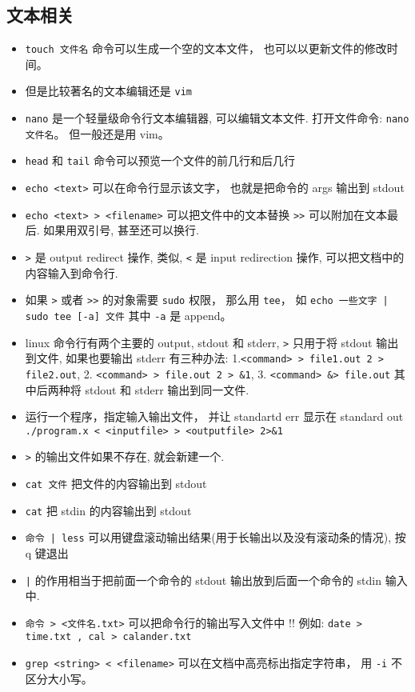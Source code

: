\subsection{文本相关}
\begin{itemize}
\item \verb`touch 文件名` 命令可以生成一个空的文本文件， 也可以以更新文件的修改时间。
\item 但是比较著名的文本编辑还是 \verb|vim|
\item \verb`nano` 是一个轻量级命令行文本编辑器, 可以编辑文本文件. 打开文件命令: \verb`nano 文件名`。 但一般还是用 vim。
\item \verb`head` 和 \verb`tail` 命令可以预览一个文件的前几行和后几行
\item \verb`echo <text>` 可以在命令行显示该文字， 也就是把命令的 args 输出到 stdout
\item \verb`echo <text> > <filename>` 可以把文件中的文本替换 \verb`>>` 可以附加在文本最后. 如果用双引号, 甚至还可以换行.
\item \verb`>` 是 output redirect 操作, 类似, \verb`<` 是 input redirection 操作, 可以把文档中的内容输入到命令行.
\item 如果 \verb|>| 或者 \verb|>>| 的对象需要 \verb|sudo| 权限， 那么用 \verb|tee|， 如 \verb`echo 一些文字 | sudo tee [-a] 文件` 其中 \verb|-a| 是 append。
\item linux 命令行有两个主要的 output, stdout 和 stderr, \verb`>` 只用于将 stdout 输出到文件, 如果也要输出 stderr 有三种办法: 1.\verb`<command> > file1.out 2 > file2.out`, 2. \verb`<command> > file.out 2 > &1`, 3. \verb`<command> &> file.out` 其中后两种将 stdout 和 stderr 输出到同一文件.
\item 运行一个程序，指定输入输出文件， 并让 standartd err 显示在 standard out \verb`./program.x < <inputfile> > <outputfile> 2>&1` 
\item \verb`>` 的输出文件如果不存在, 就会新建一个.
\item  \verb`cat 文件` 把文件的内容输出到 stdout
\item  \verb`cat` 把 stdin 的内容输出到 stdout
\item \verb`命令 | less` 可以用键盘滚动输出结果(用于长输出以及没有滚动条的情况), 按 q 键退出
\item \verb`|` 的作用相当于把前面一个命令的 stdout 输出放到后面一个命令的 stdin 输入中.
\item \verb`命令 > <文件名.txt>` 可以把命令行的输出写入文件中 !! 例如: \verb`date > time.txt , cal > calander.txt`
\item \verb`grep <string> < <filename>` 可以在文档中高亮标出指定字符串， 用 \verb|-i| 不区分大小写。

\end{itemize}
